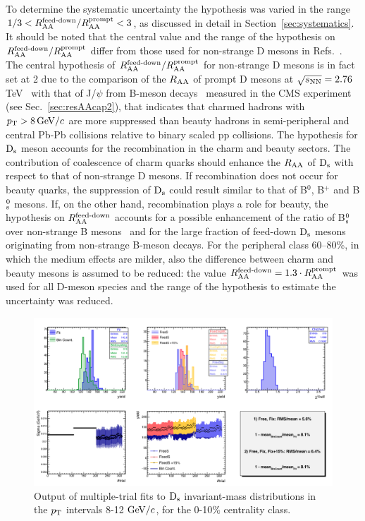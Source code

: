 To determine the systematic uncertainty the hypothesis
was varied in the range $1/3<R_{\rm AA}^{\textnormal{feed-down}}/R_{\rm AA}^{\rm prompt}<3$, as 
discussed in detail in Section~\ref{sec:systematics}.
It should be noted that the central value and the range of the hypothesis
on $R_{\rm AA}^{\textnormal{feed-down}}/R_{\rm AA}^{\rm prompt}$ differ from those used for
non-strange D mesons in Refs.~\cite{ALICE-PUBLIC-2017-003,Adam:2015sza}. The 
central hypothesis of $R_{\rm AA}^{\textnormal{feed-down}}/R_{\rm AA}^{\rm prompt}$ for non-strange
D mesons is in fact set at 2  due to the comparison of the $R_{\rm AA}$ of prompt D mesons at 
$\sqrt{s_{\rm NN}} = 2.76$ TeV~\cite{Adam:2015nna} with that of J/$\psi$ from B-meson decays~\cite{Khachatryan:2016ypw} 
measured in the CMS experiment (see Sec.~\ref{sec:resAAcap2}), that indicates that charmed hadrons 
with $p_{\rm T} > 8 \, \mathrm{GeV}/c$ are more suppressed than beauty hadrons in semi-peripheral and central
Pb-Pb collisions relative to binary scaled pp collisions. The hypothesis for ${\rm D_s}$ meson
accounts for the recombination in the charm and beauty sectors.
The contribution of coalescence of charm quarks should enhance the $R_{\rm AA}$ of
${\rm D_s}$ with respect to that of non-strange D mesons. If recombination does not occur
for beauty quarks, the suppression of ${\rm D_s}$ could result similar to that of  B$^0$, B$^+$ and B$^0_{\rm s}$
mesons. If, on the other hand, recombination plays a role for beauty,
the hypothesis on $R_{\rm AA}^{\textnormal{feed-down}}$ accounts for a possible enhancement 
of the ratio of B$^0_{\rm s}$ over non-strange B mesons~\cite{TAMULHC}
and for the large fraction of feed-down ${\rm D_s}$ mesons originating from non-strange B-meson decays.
For the peripheral class 60--80\%, in which the medium effects are milder, 
also the difference between charm and beauty mesons is assumed to be 
reduced: the value $R_{\rm AA}^{\textnormal{feed-down}}=1.3\cdot R_{\rm AA}^{\rm prompt}$ 
was used for all D-meson species and the range of the hypothesis to estimate the
uncertainty was reduced. 

\begin{figure}[!htb]
 \begin{center}
\includegraphics[width=15.cm]{./FigCap5/MT_Pt812.png}
\end{center}
 \caption{Output of multiple-trial fits to ${\rm D_s}$ invariant-mass distributions in the $p_{\rm T}$ intervals 8-12 $\mathrm{GeV}/c$, for the 0-10$\%$ centrality class.}
 \label{fig:multitrial_Ds_010}
\end{figure}


